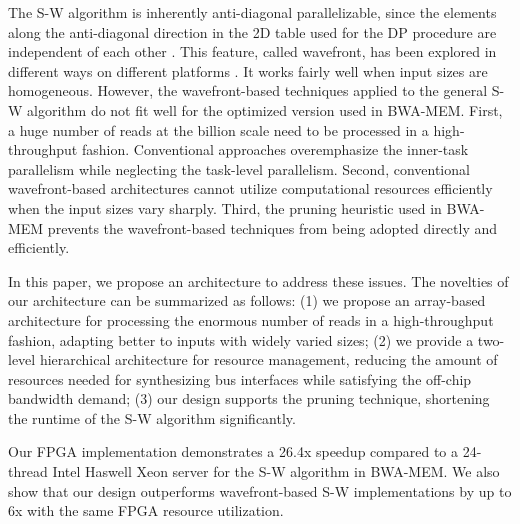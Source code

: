 The S-W algorithm is inherently anti-diagonal parallelizable, since the elements along the anti-diagonal direction in the 2D table used for the DP procedure are independent of each other \cite{Edmiston1988}. 
This feature, called wavefront, has been explored in different ways on different platforms \cite{Preusser2012}\cite{RaceLogic}\cite{Zhang2007}\cite{Lam2013}. 
It works fairly well when input sizes are homogeneous. 
However, the wavefront-based techniques applied to the general S-W algorithm do not fit well for the optimized version used in BWA-MEM. 
First, a huge number of reads at the billion scale need to be processed in a high-throughput fashion. 
Conventional approaches overemphasize the inner-task parallelism while neglecting the task-level parallelism. 
Second, conventional wavefront-based architectures cannot utilize computational resources efficiently when the input sizes vary sharply. 
Third, the pruning heuristic used in BWA-MEM prevents the wavefront-based techniques from being adopted directly and efficiently.

In this paper, we propose an architecture to address these issues.
The novelties of our architecture can be summarized as follows: 
(1) we propose an array-based architecture for processing the enormous number of reads in a high-throughput fashion, adapting better to inputs with widely varied sizes; 
(2) we provide a two-level hierarchical architecture for resource management, reducing the amount of resources needed for synthesizing bus interfaces while satisfying the off-chip bandwidth demand;
(3) our design supports the pruning technique, shortening the runtime of the S-W algorithm significantly. 

Our FPGA implementation demonstrates a 26.4x speedup compared to a 24-thread Intel Haswell Xeon server for the S-W algorithm in BWA-MEM. 
We also show that our design outperforms wavefront-based S-W implementations by up to 6x with the same FPGA resource utilization.
